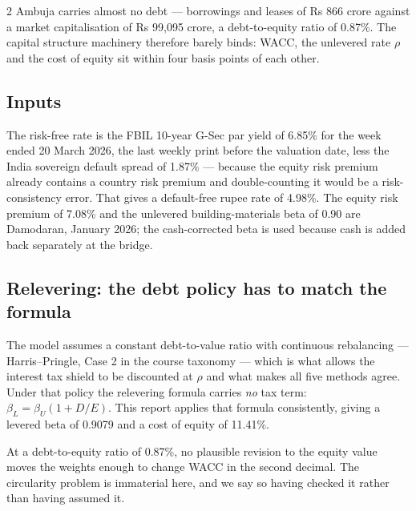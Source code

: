 \begin{paracol}{2}
Ambuja carries almost no debt — borrowings and leases of Rs 866 crore against a
market capitalisation of Rs 99,095 crore, a debt-to-equity ratio of 0.87\%. The
capital structure machinery therefore barely binds: WACC, the unlevered rate $\rho$
and the cost of equity sit within four basis points of each other.

\subsection{Inputs}

The risk-free rate is the FBIL 10-year G-Sec par yield of 6.85\% for the week ended
20 March 2026, the last weekly print before the valuation date, less the India
sovereign default spread of 1.87\% — because the equity risk premium already
contains a country risk premium and double-counting it would be a risk-consistency
error. That gives a default-free rupee rate of 4.98\%. The equity risk premium of
7.08\% and the unlevered building-materials beta of 0.90 are Damodaran, January 2026;
the cash-corrected beta is used because cash is added back separately at the bridge.

\subsection{Relevering: the debt policy has to match the formula}

The model assumes a constant debt-to-value ratio with continuous rebalancing —
Harris--Pringle, Case 2 in the course taxonomy — which is what allows the interest
tax shield to be discounted at $\rho$ and what makes all five methods agree. Under
that policy the relevering formula carries \emph{no} tax term: $\beta_L =
\beta_U(1+D/E)$. This report applies that formula consistently, giving a levered
beta of 0.9079 and a cost of equity of 11.41\%.

\begin{okbox}
At a debt-to-equity ratio of 0.87\%, no plausible revision to the equity value moves
the weights enough to change WACC in the second decimal. The circularity problem is
immaterial here, and we say so having checked it rather than having assumed it.
\end{okbox}


\end{paracol}
